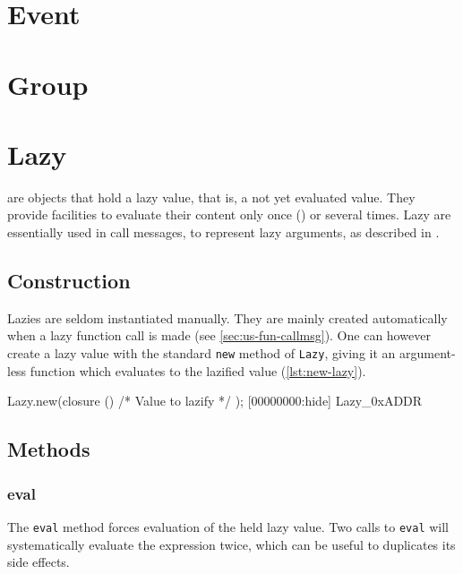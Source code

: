 

\section{Event}



\section{Group}

\section{Lazy}

 are objects that hold a lazy value, that is, a not yet evaluated
value. They provide facilities to evaluate their content only once
() or several times. Lazy are essentially used in call
messages, to represent lazy arguments, as described in
.

\subsection{Construction}

Lazies are seldom instantiated manually. They are mainly created
automatically when a lazy function call is made (see
\autoref{sec:us-fun-callmsg}). One can however create a lazy value with the
standard \lstinline|new| method of \lstinline|Lazy|, giving it an
argument-less function which evaluates to the lazified value
(\autoref{lst:new-lazy}).

\begin{urbiscript}[caption=Creating a lazy value, label=lst:new-lazy,
  float=\floatpos]
Lazy.new(closure () { /* Value to lazify */ });
[00000000:hide] Lazy_0xADDR
\end{urbiscript}

\subsection{Methods}
\subsubsection{eval}

The \lstinline|eval| method forces evaluation of the held lazy
value. Two calls to \lstinline|eval| will systematically evaluate the
expression twice, which can be useful to duplicates its side effects.

